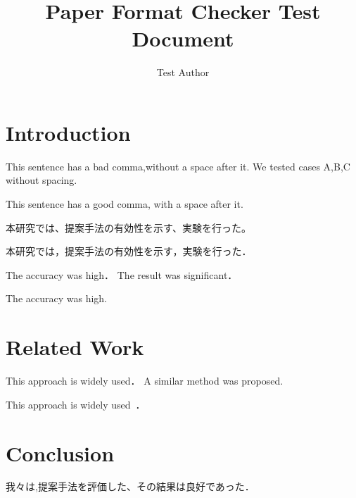 \documentclass[a4paper, 11pt]{article}
\title{Paper Format Checker Test Document}
\author{Test Author}
\begin{document}
\maketitle

\section{Introduction}

This sentence has a bad comma,without a space after it.
We tested cases A,B,C without spacing.

This sentence has a good comma, with a space after it.

本研究では、提案手法の有効性を示す、実験を行った。

本研究では，提案手法の有効性を示す，実験を行った．

The accuracy was high．
The result was significant．

The accuracy was high.

\section{Related Work}

This approach is widely used．\cite{smith2020}
A similar method was proposed.\cite{tanaka2019}

This approach is widely used~\cite{smith2020}．

\section{Conclusion}

我々は,提案手法を評価した、その結果は良好であった．\cite{yamada2021}



\end{document}
